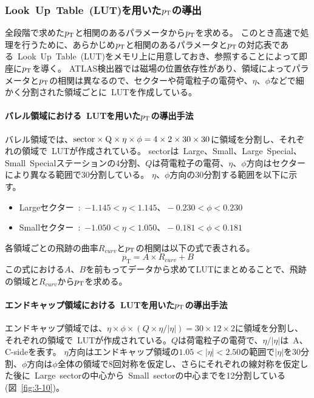 \subsubsection{Look~Up~Table~(LUT)を用いた$p_\mathrm{T}$の導出}
全段階で求めた$p_\mathrm{T}$と相関のあるパラメータから$p_\mathrm{T}$を求める。
このとき高速で処理を行うために、あらかじめ$p_\mathrm{T}$と相関のあるパラメータと$p_\mathrm{T}$の対応表である~Look~Up~Table~(LUT)をメモリ上に用意しておき、参照することによって即座に$p_\mathrm{T}$を導く。
ATLAS検出器では磁場の位置依存性があり、領域によってパラメータと$p_\mathrm{T}$の相関は異なるので、セクターや荷電粒子の電荷や、$\eta$、$\phi$などで細かく分割された領域ごとに~LUTを作成している。

\paragraph{バレル領域における~LUTを用いた$p_\mathrm{T}$の導出手法}
バレル領域では、$\rm{sector}\times Q \times \eta \times \phi = 4\times2\times30\times30$に領域を分割し、それぞれの領域で~LUTが作成されている。
sectorは~Large、Small、Large~Special、Small~Specialステーションの4分割、$Q$は荷電粒子の電荷、$\eta$、$\phi$方向はセクターにより異なる範囲で30分割している。
$\eta$、$\phi$方向の30分割する範囲を以下に示す。
\begin{itemize}
    \item Largeセクター~:~$-1.145<\eta<1.145、-0.230<\phi<0.230$
    \item Smallセクター~:~$-1.050<\eta<1.050、-0.181<\phi<0.181$
\end{itemize}


各領域ごとの飛跡の曲率$R_{curv}$と$p_\mathrm{T}$の相関は以下の式で表される。
\begin{equation}
    p_{\mathrm{T}}=A \times R_{curv}+B
\end{equation}
この式における$A$、$B$を前もってデータから求めてLUTにまとめることで、飛跡の領域と$R_{curv}$から$p_\mathrm{T}$を求める。


\paragraph{エンドキャップ領域における~LUTを用いた$p_\mathrm{T}$の導出手法}
エンドキャップ領域では、$\eta \times \phi \times (Q \times \eta/|\eta|)= 30\times12\times2$に領域を分割し、それぞれの領域で~LUTが作成されている。$Q$は荷電粒子の電荷で、$\eta/|\eta|$は~A、C-sideを表す。
$\eta$方向はエンドキャップ領域の$1.05<|\eta|<2.50$の範囲で$|\eta|$を30分割、$\phi$方向は$\phi$全体の領域で8回対称を仮定し、さらにそれぞれの線対称を仮定した後に~Large~sectorの中心から~Small~sectorの中心までを12分割している(図~\ref{fig:3-10})。

